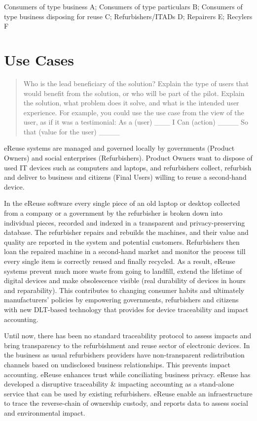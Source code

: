 \documentclass[
]{book}
\begin{document}
Consumers of type business A;
Consumers of type particulars B;
Consumers of type business disposing for reuse C;
Refurbishers/ITADs D;
Repairers E;
Recylers F

\hypertarget{use-cases}{%
\chapter{Use Cases}\label{use-cases}}

\begin{quote}
Who is the lead beneficiary of the solution?
Explain the type of users that would benefit from the solution, or who will be part of the pilot.
Explain the solution, what problem does it solve, and what is the intended user experience.
For example, you could use the use case from the view of the user, as if it was a testimonial:
As a (user) \_\_\_ I Can (action) \_\_\_\_ So that (value for the user) \_\_\_\_
\end{quote}

eReuse systems are managed and governed locally by governments (Product Owners) and social enterprises (Refurbishers). Product Owners want to dispose of used IT devices such as computers and laptops, and refurbishers collect, refurbish and deliver to business and citizens (Final Users) willing to reuse a second-hand device.

In the eReuse software every single piece of an old laptop or desktop collected from a company or a government by the refurbisher is broken down into individual pieces, recorded and indexed in a transparent and privacy-preserving database. The refurbisher repairs and rebuilds the machines, and their value and quality are reported in the system and potential customers. Refurbishers then loan the repaired machine in a second-hand market and monitor the process till every single item is correctly reused and finally recycled. As a result, eReuse systems prevent much more waste from going to landfill, extend the lifetime of digital devices and make obsolescence visible (real durability of devices in hours and reparability). This contributes to changing consumer habits and ultimately manufacturers' policies by empowering governments, refurbishers and citizens with new DLT-based technology that provides for device traceability and impact accounting.

Until now, there has been no standard traceability protocol to assess impacts and bring transparency to the refurbishment and reuse sector of electronic devices. In the business as usual refurbishers providers have non-transparent redistribution channels based on undisclosed business relationships. This prevents impact accounting. eReuse enhances trust while conciliating business privacy. eReuse has developed a disruptive traceability \& impacting accounting as a stand-alone service that can be used by existing refurbishers. eReuse enable an infraestructure to trace the reverse-chain of ownership custody, and reports data to assess social and environmental impact.
\end{document}
